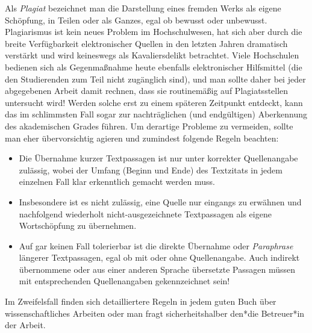Als \emph{Plagiat} bezeichnet man die Darstellung eines fremden Werks als eigene Schöpfung, 
in Teilen oder als Ganzes, egal ob bewusst oder unbewusst.
Plagiarismus ist kein neues Problem im Hochschulwesen, hat sich aber durch die 
breite Verfügbarkeit elektronischer Quellen in den letzten Jahren dramatisch 
verstärkt und wird keineswegs als Kavaliersdelikt betrachtet.
Viele Hochschulen bedienen sich als Gegenmaßnahme heute ebenfalls elektronischer Hilfsmittel 
(die den Studierenden zum Teil nicht zugänglich sind), und man sollte daher bei jeder 
abgegebenen Arbeit damit rechnen, dass sie routinemäßig auf Plagiatsstellen untersucht wird!
Werden solche erst zu einem späteren Zeitpunkt entdeckt, kann das im schlimmsten Fall sogar 
zur nachträglichen (und endgültigen) Aberkennung des akademischen Grades führen.
Um derartige Probleme zu vermeiden, sollte man eher übervorsichtig agieren und zumindest folgende Regeln beachten:
%
\begin{itemize}
\item
Die Übernahme kurzer Textpassagen ist nur unter korrekter Quellenangabe zulässig, wobei der Umfang (Beginn und Ende) des Textzitats in jedem einzelnen Fall klar erkenntlich gemacht werden muss. 
\item
Insbesondere ist es nicht zulässig, eine Quelle nur eingangs zu erwähnen und nachfolgend wiederholt nicht-ausgezeichnete Textpassagen als eigene Wortschöpfung zu übernehmen. 
\item
Auf gar keinen Fall tolerierbar ist die direkte Übernahme oder \emph{Paraphrase} längerer Textpassagen, egal ob mit oder ohne Quellenangabe. Auch indirekt übernommene oder aus einer anderen Sprache übersetzte Passagen müssen mit entsprechenden Quellenangaben gekennzeichnet sein! 
\end{itemize}
%
Im Zweifelsfall finden sich detailliertere Regeln in jedem guten Buch über wissenschaftliches Arbeiten oder man fragt sicherheitshalber den*die Betreuer*in der Arbeit.
